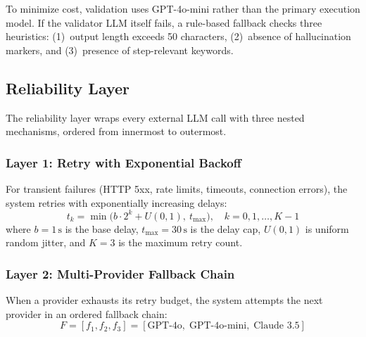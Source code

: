 \documentclass[conference]{IEEEtran}
\begin{document}
To minimize cost, validation uses GPT-4o-mini rather than the primary execution model. If the validator LLM itself fails, a rule-based fallback checks three heuristics: (1)~output length exceeds 50 characters, (2)~absence of hallucination markers, and (3)~presence of step-relevant keywords.

\subsection{Reliability Layer}
\label{sec:reliability}

The reliability layer wraps every external LLM call with three nested mechanisms, ordered from innermost to outermost.

\subsubsection{Layer 1: Retry with Exponential Backoff}

For transient failures (HTTP 5xx, rate limits, timeouts, connection errors), the system retries with exponentially increasing delays:
\begin{equation}
    t_k = \min\big(b \cdot 2^k + U(0, 1),\ t_{\max}\big), \quad k = 0, 1, \ldots, K{-}1
    \label{eq:backoff}
\end{equation}
where $b = 1\,\textrm{s}$ is the base delay, $t_{\max} = 30\,\textrm{s}$ is the delay cap, $U(0,1)$ is uniform random jitter, and $K = 3$ is the maximum retry count.

\begin{algorithm}[htbp]
    \caption{Retry with Exponential Backoff}
    \label{alg:retry}
\end{algorithm}

\subsubsection{Layer 2: Multi-Provider Fallback Chain}

When a provider exhausts its retry budget, the system attempts the next provider in an ordered fallback chain:
\begin{equation}
    F = [f_1, f_2, f_3] = [\textrm{GPT-4o},\; \textrm{GPT-4o-mini},\; \textrm{Claude~3.5}]
\end{equation}
\end{document}
